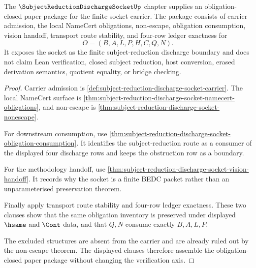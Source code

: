\begin{theorem}
\label{thm:subject-reduction-discharge-socket-obligation-closure-package}
The $\SubjectReductionDischargeSocketUp$ chapter supplies an obligation-closed paper package for the finite socket carrier. The package consists of carrier admission, the local NameCert obligations, non-escape, obligation consumption, vision handoff, transport route stability, and four-row ledger exactness for
$$
O=(B,A,L,P,H,C,Q,N).
$$
It exposes the socket as the finite subject-reduction discharge boundary and does not claim Lean verification, closed subject reduction, host conversion, erased derivation semantics, quotient equality, or bridge checking.
\end{theorem}
\begin{proof}
Carrier admission is \autoref{def:subject-reduction-discharge-socket-carrier}. The local NameCert surface is \autoref{thm:subject-reduction-discharge-socket-namecert-obligations}, and non-escape is \autoref{thm:subject-reduction-discharge-socket-nonescape}.

For downstream consumption, use \autoref{thm:subject-reduction-discharge-socket-obligation-consumption}. It identifies the subject-reduction route as a consumer of the displayed four discharge rows and keeps the obstruction row as a boundary.

For the methodology handoff, use \autoref{thm:subject-reduction-discharge-socket-vision-handoff}. It records why the socket is a finite BEDC packet rather than an unparameterised preservation theorem.

Finally apply transport route stability and four-row ledger exactness. These two clauses show that the same obligation inventory is preserved under displayed $\hsame$ and $\Cont$ data, and that $Q,N$ consume exactly $B,A,L,P$.

The excluded structures are absent from the carrier and are already ruled out by the non-escape theorem. The displayed clauses therefore assemble the obligation-closed paper package without changing the verification axis.
\end{proof}

